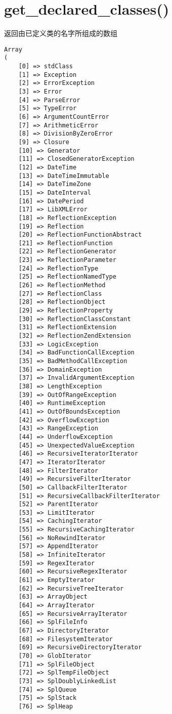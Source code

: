 \section{get\_declared\_classes()}

返回由已定义类的名字所组成的数组


\begin{lstlisting}
Array
(
    [0] => stdClass
    [1] => Exception
    [2] => ErrorException
    [3] => Error
    [4] => ParseError
    [5] => TypeError
    [6] => ArgumentCountError
    [7] => ArithmeticError
    [8] => DivisionByZeroError
    [9] => Closure
    [10] => Generator
    [11] => ClosedGeneratorException
    [12] => DateTime
    [13] => DateTimeImmutable
    [14] => DateTimeZone
    [15] => DateInterval
    [16] => DatePeriod
    [17] => LibXMLError
    [18] => ReflectionException
    [19] => Reflection
    [20] => ReflectionFunctionAbstract
    [21] => ReflectionFunction
    [22] => ReflectionGenerator
    [23] => ReflectionParameter
    [24] => ReflectionType
    [25] => ReflectionNamedType
    [26] => ReflectionMethod
    [27] => ReflectionClass
    [28] => ReflectionObject
    [29] => ReflectionProperty
    [30] => ReflectionClassConstant
    [31] => ReflectionExtension
    [32] => ReflectionZendExtension
    [33] => LogicException
    [34] => BadFunctionCallException
    [35] => BadMethodCallException
    [36] => DomainException
    [37] => InvalidArgumentException
    [38] => LengthException
    [39] => OutOfRangeException
    [40] => RuntimeException
    [41] => OutOfBoundsException
    [42] => OverflowException
    [43] => RangeException
    [44] => UnderflowException
    [45] => UnexpectedValueException
    [46] => RecursiveIteratorIterator
    [47] => IteratorIterator
    [48] => FilterIterator
    [49] => RecursiveFilterIterator
    [50] => CallbackFilterIterator
    [51] => RecursiveCallbackFilterIterator
    [52] => ParentIterator
    [53] => LimitIterator
    [54] => CachingIterator
    [55] => RecursiveCachingIterator
    [56] => NoRewindIterator
    [57] => AppendIterator
    [58] => InfiniteIterator
    [59] => RegexIterator
    [60] => RecursiveRegexIterator
    [61] => EmptyIterator
    [62] => RecursiveTreeIterator
    [63] => ArrayObject
    [64] => ArrayIterator
    [65] => RecursiveArrayIterator
    [66] => SplFileInfo
    [67] => DirectoryIterator
    [68] => FilesystemIterator
    [69] => RecursiveDirectoryIterator
    [70] => GlobIterator
    [71] => SplFileObject
    [72] => SplTempFileObject
    [73] => SplDoublyLinkedList
    [74] => SplQueue
    [75] => SplStack
    [76] => SplHeap

\end{lstlisting}
